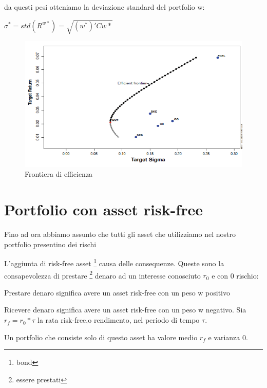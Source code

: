 \documentclass[a4paper,11pt]{report}
\begin{document}
{	da questi pesi otteniamo la deviazione standard del portfolio w:
\begin{center}
	$\sigma^*=std(R^{w*})=\sqrt{(w^*)'Cw*}$
\end{center}
\begin{figure}[h]
  \includegraphics[width=\linewidth]{EfficientFrontier.png}
  \caption{Frontiera di efficienza}
  \label{fig:EfficientFrontier}
\end{figure}

\newpage

\section{Portfolio con asset risk-free}
	Fino ad ora abbiamo assunto che tutti gli asset che utilizziamo nel nostro portfolio presentino dei rischi

	L'aggiunta di risk-free asset \footnote{bond} causa delle consequenze.
	Queste sono la consapevolezza di prestare \footnote{essere prestati} denaro ad un interesse conosciuto $r_0$ e con 0 rischio:
	
	Prestare denaro significa avere un asset risk-free con un peso w positivo

	Ricevere denaro significa avere un asset risk-free con un peso w negativo. \newline
	Sia $r_f=r_0* \tau$ la rata risk-free,o rendimento, nel periodo di tempo $\tau$.

	Un portfolio che consiste solo di questo asset ha valore medio $r_f$ e varianza 0.

}
\end{document}

